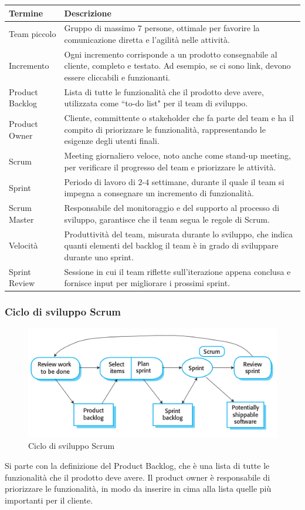 \begin{center}
\begin{tabular}{|p{4cm}|p{9cm}|}
\hline
\textbf{Termine} & \textbf{Descrizione} \\
\hline
Team piccolo & Gruppo di massimo $7$ persone, ottimale per favorire la comunicazione diretta e l'agilità nelle attività. \\
\hline
Incremento & Ogni incremento corrisponde a un prodotto consegnabile al cliente, completo e testato. Ad esempio, se ci sono link, devono essere cliccabili e funzionanti. \\
\hline
Product Backlog & Lista di tutte le funzionalità che il prodotto deve avere, utilizzata come ``to-do list" per il team di sviluppo. \\
\hline
Product Owner & Cliente, committente o stakeholder che fa parte del team e ha il compito di priorizzare le funzionalità, rappresentando le esigenze degli utenti finali. \\
\hline
Scrum & Meeting giornaliero veloce, noto anche come stand-up meeting, per verificare il progresso del team e priorizzare le attività. \\
\hline
Sprint & Periodo di lavoro di $2$-$4$ settimane, durante il quale il team si impegna a consegnare un incremento di funzionalità. \\
\hline
Scrum Master & Responsabile del monitoraggio e del supporto al processo di sviluppo, garantisce che il team segua le regole di Scrum. \\
\hline
Velocità & Produttività del team, misurata durante lo sviluppo, che indica quanti elementi del backlog il team è in grado di sviluppare durante uno sprint. \\
\hline
Sprint Review & Sessione in cui il team riflette sull'iterazione appena conclusa e fornisce input per migliorare i prossimi sprint. \\
\hline
\end{tabular}
\end{center}

\subsubsection{Ciclo di sviluppo Scrum}
\begin{figure}[H]
    \centering
    \includegraphics[scale=0.6]{img/sprintcycle.png}
    \caption{Ciclo di sviluppo Scrum}
\end{figure}
Si parte con la definizione del Product Backlog, che è una lista di tutte le
funzionalità che il prodotto deve avere. Il product owner è responsabile di
priorizzare le funzionalità, in modo da inserire in cima alla lista quelle più
importanti per il cliente.


